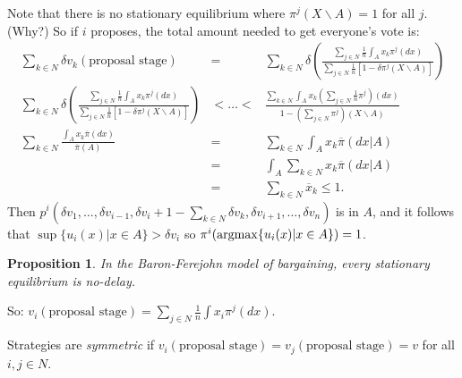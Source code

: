 \documentclass[12pt]{article}
\newtheorem{propo}{Proposition}[section]
\newcommand{\argmax}{\operatornamewithlimits{argmax}}
\newcommand{\n}{\noindent}
\newcommand{\s}{\vspace{5mm}}
\begin{document}
\s
\n Note that there is no stationary equilibrium where $\pi^j(X\backslash A)=1$ for all $j$.  (Why?)  So if $i$ proposes, the total amount needed to get everyone's vote is:
\begin{eqnarray*}
\sum_{k\in N}\delta v_k(\mbox{proposal stage})&=&\sum_{k\in N}\delta\left(\frac{\sum_{j\in N}\frac{1}{n}\int_A x_k\pi^j(dx)}{\sum_{j\in N}\frac{1}{n}\left[1-\delta\pi^j(X\backslash A)\right]}\right)\\
\sum_{k\in N}\delta\left(\frac{\sum_{j\in N}\frac{1}{n}\int_A x_k\pi^j(dx)}{\sum_{j\in N}\frac{1}{n}\left[1-\delta\pi^j(X\backslash A)\right]}\right)&<\hdots<&\frac{\sum_{k\in N}\int_Ax_k\left(\sum_{j\in N}\frac{1}{n}\pi^j\right)(dx)}{1-\left(\sum_{j\in N}\pi^j\right)(X\backslash A)}\\
\sum_{k\in N}\frac{\int_Ax_k\overline{\pi}(dx)}{\overline{\pi}(A)}&=&\sum_{k\in N}\int_Ax_k\overline{\pi}(dx|A)\\
&=&\int_A\sum_{k\in N}x_k\overline{\pi}(dx|A)\\
&=&\sum_{k\in N}\overline{x}_k\leq 1.
\end{eqnarray*}  Then $p^i(\delta v_1,\hdots,\delta v_{i-1},\delta v_i+1-\sum_{k\in N}\delta v_k,\delta v_{i+1},\hdots,\delta v_n)$ is in $A$, and it follows that $\sup\{u_i(x)|x\in A\}>\delta v_i$ so $\pi^i(\argmax\{u_i(x)|x\in A\})=1$.

\s
\n\begin{propo}  In the Baron-Ferejohn model of bargaining, every stationary equilibrium is no-delay.
\end{propo}

\s
\n So: $v_i(\mbox{proposal stage})=\sum_{j\in N}\frac{1}{n}\int x_i\pi^j(dx)$.

\s
\n Strategies are \textit{symmetric} if $v_i(\mbox{proposal stage})=v_j(\mbox{proposal stage})=v$ for all $i,j\in N$.
\end{document}
